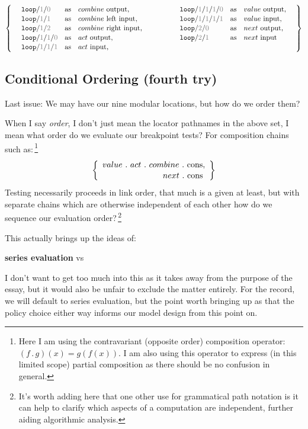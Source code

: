 \documentclass[twoside]{article}
\newcommand{\strong}[1]{{\bfseries #1}}
\newcommand{\as}{\mbox{as}}
\newcommand{\vi}[1][\_]{\mbox{$value$#1input}}
\newcommand{\vo}[1][\_]{\mbox{$value$#1output}}
\newcommand{\ai}[1][\_]{\mbox{$act$#1input}}
\newcommand{\ao}[1][\_]{\mbox{$act$#1output}}
\newcommand{\cli}[1][\_]{\mbox{$combine$#1left#1input}}
\newcommand{\cri}[1][\_]{\mbox{$combine$#1right#1input}}
\newcommand{\co}[1][\_]{\mbox{$combine$#1output}}
\newcommand{\nei}[1][\_]{\mbox{$next$#1input}}
\newcommand{\no}[1][\_]{\mbox{$next$#1output}}
\newcommand{\tab}[1][1.125cm]{\hspace{#1}}
\newcommand{\col}[1][0ex]{& \hspace{#1}}
\newcommand{\tcg}[1]{\textcolor{gray}{#1}}
\newcommand{\tlp}{\texttt{\mbox{loop}}}
\newcommand{\cons}{\mbox{cons}}
\begin{document}
$$ \def\arraystretch{1.1}\left\{\tab[2ex]\begin{array}{lcllcl}
\tlp/\tcg{1}/\tcg{0} 		& \as & \co[ ],		\col[10ex] \tlp/\tcg{1}/\tcg{1}/\tcg{1}/\tcg{0}		& \as & \vo[ ],		\\
\tlp/\tcg{1}/\tcg{1}		& \as & \cli[ ],	\col[10ex] \tlp/\tcg{1}/\tcg{1}/\tcg{1}/\tcg{1}		& \as & \vi[ ],		\\
\tlp/\tcg{1}/\tcg{2}		& \as & \cri[ ],	\col[10ex] \tlp/\tcg{2}/\tcg{0}				& \as & \no[ ],		\\
\tlp/\tcg{1}/\tcg{1}/\tcg{0}	& \as & \ao[ ],		\col[10ex] \tlp/\tcg{2}/\tcg{1}				& \as & \nei[ ]		\\
\tlp/\tcg{1}/\tcg{1}/\tcg{1}	& \as & \ai[ ],
\end{array}\tab[2ex]\right\} $$

\subsection*{Conditional Ordering (fourth try)}

Last issue: We may have our nine modular locations, but how do we order them?

When I say \emph{order}, I don't just mean the locator pathnames in the above set, I mean what order do we evaluate
our breakpoint tests? For composition chains such as:\,\footnote{Here I am using the contravariant (opposite order)
composition operator: $ (f\,.\,g)(x) = g(f(x)) $. I am also using this operator to express (in this limited scope)
partial composition as there should be no confusion in general.}
$$ \left\{\begin{array}{r}
value\ .\ act\ .\ combine\ .\ \cons,			\\
next\ .\ \cons\hspace{0.6ex}
\end{array}\right\} $$
Testing necessarily proceeds in link order, that much is a given at least, but with separate chains which are otherwise
independent of each other how do we sequence our evaluation order?\,\footnote{It's worth adding here that one other
use for grammatical path notation is it can help to clarify which aspects of a computation are independent,
further aiding algorithmic analysis.}

This actually brings up the ideas of:
\begin{center}
\strong{series evaluation} \qquad \mbox{vs} \qquad \strong{parallel evaluation}
\end{center}
I don't want to get too much into this as it takes away from the purpose of the essay, but it would also be unfair to exclude
the matter entirely. For the record, we will default to series evaluation, but the point worth bringing up as that the policy
choice either way informs our model design from this point on.
\end{document}
